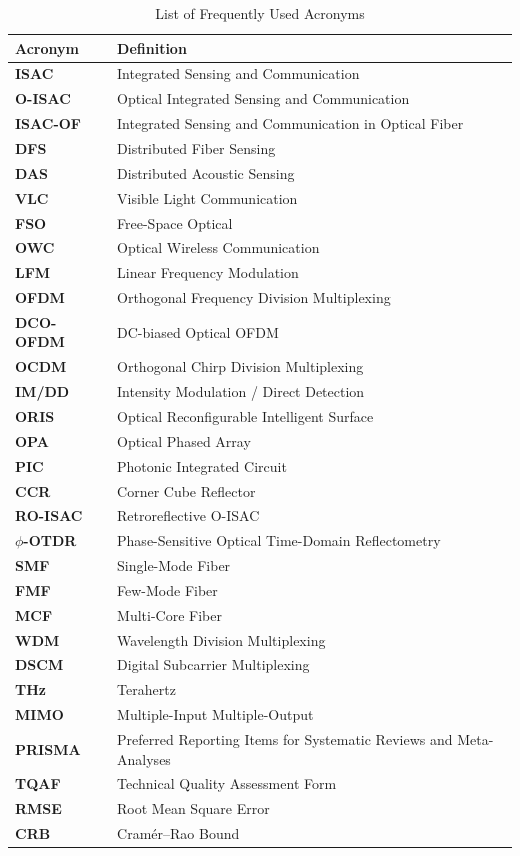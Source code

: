 \documentclass[lettersize,journal]{IEEEtran}
\begin{document}
\begin{table}[!t]
\caption{List of Frequently Used Acronyms}
\label{tab:acronyms}
\centering
\footnotesize
\begin{tabularx}{\columnwidth}{@{}>{\raggedright\arraybackslash}p{2.6cm}>{\raggedright\arraybackslash}X@{}}
\toprule
\textbf{Acronym} & \textbf{Definition} \\
\midrule
\textbf{ISAC} & Integrated Sensing and Communication \\
\textbf{O-ISAC} & Optical Integrated Sensing and Communication \\
\textbf{ISAC-OF} & Integrated Sensing and Communication in Optical Fiber \\
\textbf{DFS} & Distributed Fiber Sensing \\
\textbf{DAS} & Distributed Acoustic Sensing \\
\textbf{VLC} & Visible Light Communication \\
\textbf{FSO} & Free-Space Optical \\
\textbf{OWC} & Optical Wireless Communication \\
\textbf{LFM} & Linear Frequency Modulation \\
\textbf{OFDM} & Orthogonal Frequency Division Multiplexing \\
\textbf{DCO-OFDM} & DC-biased Optical OFDM \\
\textbf{OCDM} & Orthogonal Chirp Division Multiplexing \\
\textbf{IM/DD} & Intensity Modulation / Direct Detection \\
\textbf{ORIS} & Optical Reconfigurable Intelligent Surface \\
\textbf{OPA} & Optical Phased Array \\
\textbf{PIC} & Photonic Integrated Circuit \\
\textbf{CCR} & Corner Cube Reflector \\
\textbf{RO-ISAC} & Retroreflective O-ISAC \\
\textbf{$\phi$-OTDR} & Phase-Sensitive Optical Time-Domain Reflectometry \\
\textbf{SMF} & Single-Mode Fiber \\
\textbf{FMF} & Few-Mode Fiber \\
\textbf{MCF} & Multi-Core Fiber \\
\textbf{WDM} & Wavelength Division Multiplexing \\
\textbf{DSCM} & Digital Subcarrier Multiplexing \\
\textbf{THz} & Terahertz \\
\textbf{MIMO} & Multiple-Input Multiple-Output \\
\textbf{PRISMA} & Preferred Reporting Items for Systematic Reviews and Meta-Analyses \\
\textbf{TQAF} & Technical Quality Assessment Form \\
\textbf{RMSE} & Root Mean Square Error \\
\textbf{CRB} & Cram\'er--Rao Bound \\
\bottomrule
\end{tabularx}
\end{table}
\end{document}
